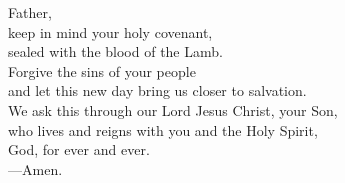 \prayer


\begin{prayerverse}
Father,\\
keep in mind your holy covenant,\\
sealed with the blood of the Lamb.\\
Forgive the sins of your people\\
and let this new day bring us closer to salvation.\\
We ask this through our Lord Jesus Christ, your Son,\\
who lives and reigns with you and the Holy Spirit,\\
God, for ever and ever.\\
{\color{red}---\thinspace}Amen.
\end{prayerverse}

